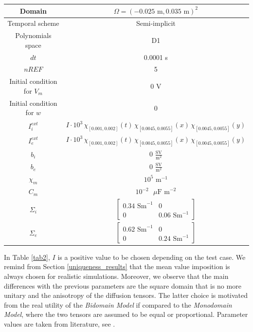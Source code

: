 \documentclass[a4paper,11pt]{article}
\begin{document}
\begin{center}
	\label{tab2}
	\begin{tabular}{|c|c|} 
		\hline 
		\rule[-4mm]{0mm}{1cm}
		Domain & $\Omega=(-0.025 \text{ m}, 0.035 \text{ m})^2$ \\
		\hline
		\rule[-4mm]{0mm}{1cm}
		Temporal scheme & Semi-implicit \\
		\hline
		\rule[-4mm]{0mm}{1cm}
		Polynomials space & D1 \\
		\hline
		\rule[-4mm]{0mm}{1cm}
		$dt$ & 0.0001 s \\
		\hline
		\rule[-4mm]{0mm}{1cm}
		$nREF$ & 5 \\ 
		\hline
		\rule[-4mm]{0mm}{1cm}
		Initial condition for $V_m$ & 0 V \\
		\hline
		\rule[-4mm]{0mm}{1cm}
		Initial condition for $w$ & 0 \\
		\hline
		\rule[-4mm]{0mm}{1cm}
		$I_i^{ext}$ & $I \cdot 10^3 \, \chi_{[0.001,0.002]}(t) \, \chi_{[0.0045,0.0055]}(x) \, \chi_{[0.0045,0.0055]}(y)$ \\
		\hline
		\rule[-4mm]{0mm}{1cm}
		$I_e^{ext}$ & $I \cdot 10^3 \, \chi_{[0.001,0.002]}(t) \, \chi_{[0.0045,0.0055]}(x) \, \chi_{[0.0045,0.0055]}(y)$ \\
		\hline
		\rule[-4mm]{0mm}{1cm}
		$b_i$ & 0 $\frac{\text{SV}}{{\text{m}}^2}$\\
		\hline
		\rule[-4mm]{0mm}{1cm}
		$b_e$ & 0 $\frac{\text{SV}}{{\text{m}}^2}$\\
		\hline 
		\rule[-4mm]{0mm}{1cm}
		$\chi_m$ & $10^5 \text{ m}^{-1}$ \\
		\hline 
		\rule[-4mm]{0mm}{1cm}
		$C_m$ & $10^{-2} \text{ $\mu$F m}^{-2}$ \\
		\hline
		\rule[-4mm]{0mm}{1cm}
		$\Sigma_i$ & $\begin{bmatrix} 0.34 \text{ Sm}^{-1} & 0 \\ 0 & 0.06 \text{ Sm}^{-1}\end{bmatrix}$ \\
		\hline
		\rule[-4mm]{0mm}{1cm}
		$\Sigma_e$ & $\begin{bmatrix} 0.62 \text{ Sm}^{-1} & 0 \\ 0 & 0.24 \text{ Sm}^{-1} \end{bmatrix}$ \\
		\hline 
	\end{tabular}
\end{center}
 \vspace{4mm}
\noindent In Table \ref{tab2}, $I$ is a positive value to be chosen depending on the test case. We remind from Section \ref{uniqueness_results} that the mean value imposition is always chosen for realistic simulations. Moreover, we observe that the main differences with the previous parameters are the square domain that is no more unitary and the anisotropy of the diffusion tensors. The latter choice is motivated from the real utility of the \emph{Bidomain Model} if compared to the \emph{Monodomain Model}, where the two tensors are assumed to be equal or proportional. Parameter values are taken from literature, see \cite{acta}. \\
\end{document}
